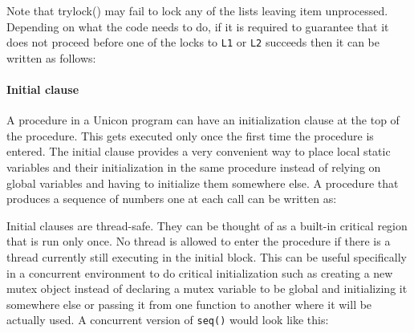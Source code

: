 
Note that trylock() may fail to lock any of the lists leaving item
unprocessed. Depending on what the code needs to do, if it is required
to guarantee that it does not proceed before one of the locks to
\texttt{L1} or \texttt{L2} succeeds
then it can be written as follows:


\paragraph[Initial clause]{Initial clause}
A procedure in a Unicon program can have an initialization clause at the
top of the procedure. This gets executed only once the first time the
procedure is entered. The initial clause provides a very convenient way
to place local static variables and their initialization in the same
procedure instead of relying on global variables and having to
initialize them somewhere else. A procedure that produces a sequence of
numbers one at each call can be written as:


Initial clauses are thread-safe. They can be thought of as a built-in
critical region that is run only once. No thread is allowed to enter
the procedure if there is a thread currently still executing in the
initial block. This can be useful specifically in a concurrent
environment to do critical initialization such as creating a new mutex
object instead of declaring a mutex variable to be global and
initializing it somewhere else or passing it from one function to
another where it will be actually used. A concurrent version of
\texttt{seq()} would look like this:


